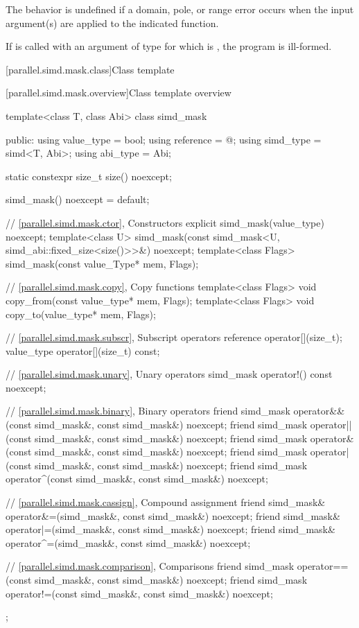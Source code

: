 \pnum
The behavior is undefined if a domain, pole, or range error occurs when the input argument(s) are applied to the indicated  function.

\pnum
If  is called with an argument of type  for which  is , the program is ill-formed.

[parallel.simd.mask.class]{Class template }

[parallel.simd.mask.overview]{Class template  overview}

\begin{codeblock}
template<class T, class Abi> class simd_mask {
public:
  using value_type = bool;
  using reference = @\seebelow@;
  using simd_type = simd<T, Abi>;
  using abi_type = Abi;

  static constexpr size_t size() noexcept;

  simd_mask() noexcept = default;

  // \ref{parallel.simd.mask.ctor}, Constructors
  explicit simd_mask(value_type) noexcept;
  template<class U>
    simd_mask(const simd_mask<U, simd_abi::fixed_size<size()>>&) noexcept;
  template<class Flags> simd_mask(const value_Type* mem, Flags);

  // \ref{parallel.simd.mask.copy}, Copy functions
  template<class Flags> void copy_from(const value_type* mem, Flags);
  template<class Flags> void copy_to(value_type* mem, Flags);

  // \ref{parallel.simd.mask.subscr}, Subscript operators
  reference operator[](size_t);
  value_type operator[](size_t) const;

  // \ref{parallel.simd.mask.unary}, Unary operators
  simd_mask operator!() const noexcept;

  // \ref{parallel.simd.mask.binary}, Binary operators
  friend simd_mask operator&&(const simd_mask&, const simd_mask&) noexcept;
  friend simd_mask operator||(const simd_mask&, const simd_mask&) noexcept;
  friend simd_mask operator&(const simd_mask&, const simd_mask&) noexcept;
  friend simd_mask operator|(const simd_mask&, const simd_mask&) noexcept;
  friend simd_mask operator^(const simd_mask&, const simd_mask&) noexcept;

  // \ref{parallel.simd.mask.cassign}, Compound assignment
  friend simd_mask& operator&=(simd_mask&, const simd_mask&) noexcept;
  friend simd_mask& operator|=(simd_mask&, const simd_mask&) noexcept;
  friend simd_mask& operator^=(simd_mask&, const simd_mask&) noexcept;

  // \ref{parallel.simd.mask.comparison}, Comparisons
  friend simd_mask operator==(const simd_mask&, const simd_mask&) noexcept;
  friend simd_mask operator!=(const simd_mask&, const simd_mask&) noexcept;
};
\end{codeblock}

